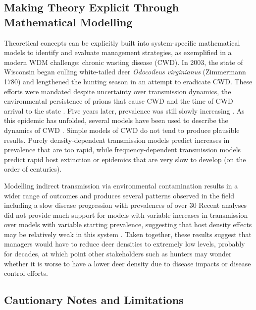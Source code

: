 \subsection{Making Theory Explicit Through Mathematical Modelling}

Theoretical concepts can be explicitly built into system-specific mathematical models to identify and evaluate management strategies, as exemplified in a modern WDM challenge: chronic wasting disease (CWD).
In 2003, the state of Wisconsin began culling white-tailed deer \textit{Odocoileus virginianus} (Zimmermann 1780) and lengthened the hunting season in an attempt to eradicate CWD.
These efforts were mandated despite uncertainty over transmission dynamics, the environmental persistence of prions that cause CWD and the time of CWD arrival to the state \citep{bartelt2003environmental}.
Five years later, prevalence was still slowly increasing \citep{Heisey2010}.
As this epidemic has unfolded, several models have been used to describe the dynamics of CWD \citep{gross2001chronic, Wasserberg2009, wild2011role}.
Simple models of CWD do not tend to produce plausible results.
Purely density-dependent transmission models predict increases in prevalence that are too rapid, while frequency-dependent transmission models predict rapid host extinction or epidemics that are very slow to develop (on the order of centuries).

Modelling indirect transmission via environmental contamination results in a wider range of outcomes and produces several patterns observed in the field including a slow disease progression with prevalences of over 30%
Recent analyses did not provide much support for models with variable increases in transmission over models with variable starting prevalence, suggesting that host density effects may be relatively weak in this system \citep{Heisey2010}.
Taken together, these results suggest that managers would have to reduce deer densities to extremely low levels, probably for decades, at which point other stakeholders such as hunters may wonder whether it is worse to have a lower deer density due to disease impacts or disease control efforts.

\subsection{Cautionary Notes and Limitations}

